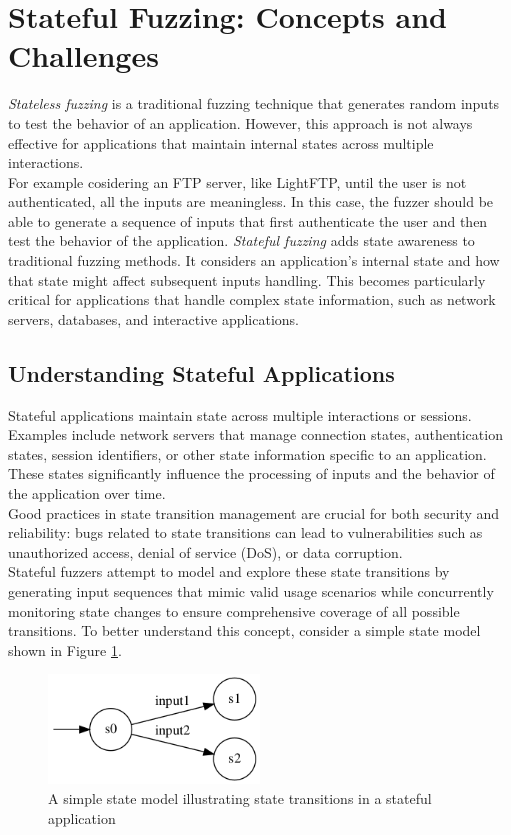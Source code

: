 \section{Stateful Fuzzing: Concepts and Challenges}
\textit{Stateless fuzzing} is a traditional fuzzing technique that generates random inputs to test the behavior of an application. However, this approach is not always effective for applications that maintain internal states across multiple interactions.
\\For example cosidering an FTP server, like LightFTP, until the user is not authenticated, all the inputs are meaningless. In this case, the fuzzer should be able to generate a sequence of inputs that first authenticate the user and then test the behavior of the application.
\textit{Stateful fuzzing} adds state awareness to traditional fuzzing methods. It considers an application's internal state and how that state might affect subsequent inputs handling. This becomes particularly critical for applications that handle complex state information, such as network servers, databases, and interactive applications.

\subsection{Understanding Stateful Applications}
Stateful applications maintain state across multiple interactions or sessions. Examples include network servers that manage connection states, authentication states, session identifiers, or other state information specific to an application. These states significantly influence the processing of inputs and the behavior of the application over time.
\\Good practices in state transition management are crucial for both security and reliability: bugs related to state transitions can lead to vulnerabilities such as unauthorized access, denial of service (DoS), or data corruption. 
\\Stateful fuzzers attempt to model and explore these state transitions by generating input sequences that mimic valid usage scenarios while concurrently monitoring state changes to ensure comprehensive coverage of all possible transitions. To better understand this concept, consider a simple state model shown in Figure \ref{fig:simplestatemodel}.

\begin{figure}[h]
    \centering
    \includegraphics[width=0.5\textwidth]{Images/simplestatemodel.png}
    \caption{A simple state model illustrating state transitions in a stateful application}
    \label{fig:simplestatemodel}
\end{figure}


